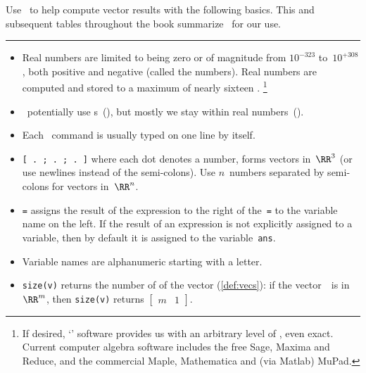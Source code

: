 \begin{table}
\caption{Use \script\ to help compute vector results with the following basics.  
This and subsequent tables throughout the book summarize \script\ for our use.
} \label{tbl:mtlbpre}
\hrule
\begin{minipage}{\linewidth}
\begin{itemize}
\item Real numbers are limited to being zero or of magnitude from \(10^{-323}\)  to~\(10^{+308}\), both positive and negative (called the  numbers).
Real numbers are computed and stored to a maximum  of nearly sixteen .%
\footnote{If desired, `' software provides us with an arbitrary level of , even exact.
Current computer algebra software includes the free Sage, Maxima and Reduce, and the commercial Maple, Mathematica and (via Matlab) MuPad.}

\item \script\ potentially use s~(\CC), but mostly we stay within real numbers~(\RR).

\item Each \script\ command is usually typed on one line by itself.

\item {}\verb|[ . ; . ; . ]| where each dot denotes a number, forms vectors in~\(\RR^3\) (or use newlines instead of the semi-colons).  
Use \(n\)~numbers separated by semi-colons for vectors in~\(\RR^n\).

\item {}\verb|=| assigns the result of the expression to the right of the~\verb|=| to the variable name on the left.
If the result of an expression is not explicitly assigned to a variable, then by default it is assigned to the variable~\verb|ans|.

\item Variable names are alphanumeric starting with a letter.

\item {}\verb|size(v)| returns the number of  of the vector (\cref{def:vecs}): if the vector~\vv\ is in~\(\RR^m\), then \verb|size(v)| returns \(\begin{bmatrix} m&1 \end{bmatrix}\).


\end{itemize}
\end{minipage}
\end{table}
